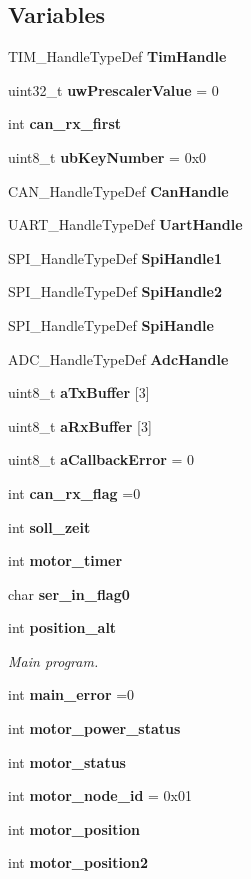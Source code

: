 \subsection*{Variables}
\begin{DoxyCompactItemize}
\item 
T\+I\+M\+\_\+\+Handle\+Type\+Def \textbf{ Tim\+Handle}
\item 
uint32\+\_\+t \textbf{ uw\+Prescaler\+Value} = 0
\item 
int \textbf{ can\+\_\+rx\+\_\+first}
\item 
uint8\+\_\+t \textbf{ ub\+Key\+Number} = 0x0
\item 
C\+A\+N\+\_\+\+Handle\+Type\+Def \textbf{ Can\+Handle}
\item 
U\+A\+R\+T\+\_\+\+Handle\+Type\+Def \textbf{ Uart\+Handle}
\item 
S\+P\+I\+\_\+\+Handle\+Type\+Def \textbf{ Spi\+Handle1}
\item 
S\+P\+I\+\_\+\+Handle\+Type\+Def \textbf{ Spi\+Handle2}
\item 
S\+P\+I\+\_\+\+Handle\+Type\+Def \textbf{ Spi\+Handle}
\item 
A\+D\+C\+\_\+\+Handle\+Type\+Def \textbf{ Adc\+Handle}
\item 
uint8\+\_\+t \textbf{ a\+Tx\+Buffer} [3]
\item 
uint8\+\_\+t \textbf{ a\+Rx\+Buffer} [3]
\item 
uint8\+\_\+t \textbf{ a\+Callback\+Error} = 0
\item 
int \textbf{ can\+\_\+rx\+\_\+flag} =0
\item 
int \textbf{ soll\+\_\+zeit}
\item 
int \textbf{ motor\+\_\+timer}
\item 
char \textbf{ ser\+\_\+in\+\_\+flag0}
\item 
int \textbf{ position\+\_\+alt}
\begin{DoxyCompactList}\small\item\em Main program. \end{DoxyCompactList}\item 
int \textbf{ main\+\_\+error} =0
\item 
int \textbf{ motor\+\_\+power\+\_\+status}
\item 
int \textbf{ motor\+\_\+status}
\item 
int \textbf{ motor\+\_\+node\+\_\+id} = 0x01
\item 
int \textbf{ motor\+\_\+position}
\item 
int \textbf{ motor\+\_\+position2}

\end{DoxyCompactItemize}
